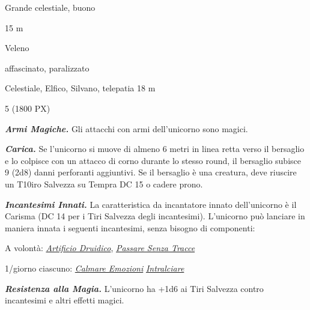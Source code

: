 \begin{multicols}{2}
{
\begin{description}[noitemsep, topsep=0pt, parsep=0pt, partopsep=0pt, itemsep=1pt, leftmargin=2.35cm,  labelwidth=2.2cm, itemindent=0cm, listparindent=0pt] %
\setlength{\baselineskip}{10pt}
\item[\textbf{Taglia/Tipo}] Grande celestiale, buono
\item[\textbf{Caratt.}] 
\item[\textbf{Punti Ferita}] 
\item[\textbf{Movimento}] 15 m
\item[\textbf{Tiri Salvez.}] 
\item[\textbf{Imm. Danni}] Veleno
\item[\textbf{Immunità}] affascinato, paralizzato
\item[\textbf{Sensi}] 
\item[\textbf{Linguaggi}] Celestiale, Elfico, Silvano, telepatia 18 m
\item[\textbf{Sfida}] 5 (1800 PX)
\end{description}
\smallskip

\emph{\textbf{Armi Magiche.}} Gli attacchi con armi dell'unicorno sono magici.

\emph{\textbf{Carica.}} Se l'unicorno si muove di almeno 6 metri in linea retta verso il bersaglio e lo colpisce con un attacco di corno durante lo stesso round, il bersaglio subisce 9 (2d8) danni perforanti aggiuntivi. Se il bersaglio è una creatura, deve riuscire un T10iro Salvezza su Tempra DC 15 o cadere prono.

\emph{\textbf{Incantesimi Innati.}} La caratteristica da incantatore innato dell'unicorno è il Carisma (DC 14 per i Tiri Salvezza degli incantesimi). L'unicorno può lanciare in maniera innata i seguenti incantesimi, senza bisogno di componenti:

A volontà: \emph{\hyperlink{Artificio Druidico}{Artificio Druidico}}, \emph{\hyperlink{Passare Senza Tracce}{Passare Senza Tracce}}

1/giorno ciascuno: \emph{\hyperlink{Calmare Emozioni}{Calmare Emozioni}} \emph{\hyperlink{Intralciare}{Intralciare}}

\emph{\textbf{Resistenza alla Magia.}} L'unicorno ha +1d6 ai Tiri Salvezza contro incantesimi e altri effetti magici.

}
\end{multicols}
